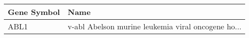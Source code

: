 \begin{tabular}{ll}
\toprule
Gene Symbol &                                               Name \\
\midrule
       ABL1 & v-abl Abelson murine leukemia viral oncogene ho... \\
\bottomrule
\end{tabular}
